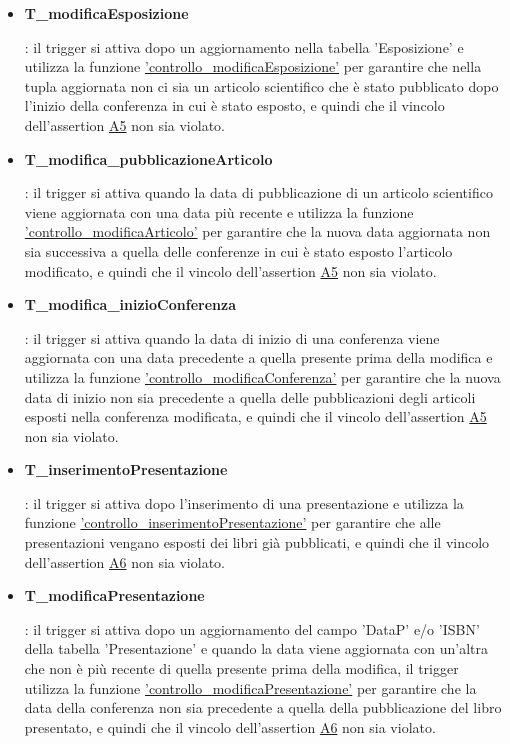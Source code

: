 \documentclass{article}
\begin{document}
\begin{itemize}
   \item \hypertarget{t12}{\textbf{T\_modificaEsposizione}}: il trigger si attiva dopo un aggiornamento nella tabella 'Esposizione' e utilizza la funzione \hyperlink{f12}{'controllo\_modificaEsposizione'} per garantire che nella tupla aggiornata non ci sia un articolo scientifico che è stato pubblicato dopo l'inizio della conferenza in cui è stato esposto, e quindi che il vincolo dell'assertion \hyperlink{assertion5}{A5} non sia violato.

   \item \hypertarget{t13}{\textbf{T\_modifica\_pubblicazioneArticolo}}: il trigger si attiva quando la data di pubblicazione di un articolo scientifico viene aggiornata con una data più recente e utilizza la funzione \hyperlink{f13}{'controllo\_modificaArticolo'} per garantire che la nuova data aggiornata non sia successiva a quella delle conferenze in cui è stato esposto l'articolo modificato, e quindi che il vincolo dell'assertion \hyperlink{assertion5}{A5} non sia violato.

   \item \hypertarget{t14}{\textbf{T\_modifica\_inizioConferenza}}: il trigger si attiva quando la data di inizio di una conferenza viene aggiornata con una data precedente a quella presente prima della modifica e utilizza la funzione \hyperlink{f14}{'controllo\_modificaConferenza'} per garantire che la nuova data di inizio non sia precedente a quella delle pubblicazioni degli articoli esposti nella conferenza modificata, e quindi che il vincolo dell'assertion \hyperlink{assertion5}{A5} non sia violato.

   \item \hypertarget{t15}{\textbf{T\_inserimentoPresentazione}}: il trigger si attiva dopo l'inserimento di una presentazione e utilizza la funzione \hyperlink{f15}{'controllo\_inserimentoPresentazione'} per garantire che alle presentazioni vengano esposti dei libri già pubblicati, e quindi che il vincolo dell'assertion \hyperlink{assertion6}{A6} non sia violato.

   \item \hypertarget{t16}{\textbf{T\_modificaPresentazione}}: il trigger si attiva dopo un aggiornamento del campo 'DataP' e/o 'ISBN' della tabella 'Presentazione' e quando la data viene aggiornata con un'altra che non è più recente di quella presente prima della modifica, il trigger utilizza la funzione \hyperlink{f16}{'controllo\_modificaPresentazione'} per garantire che la data della conferenza non sia precedente a quella della pubblicazione del libro presentato, e quindi che il vincolo dell'assertion \hyperlink{assertion6}{A6} non sia violato.


\end{itemize}
\end{document}
